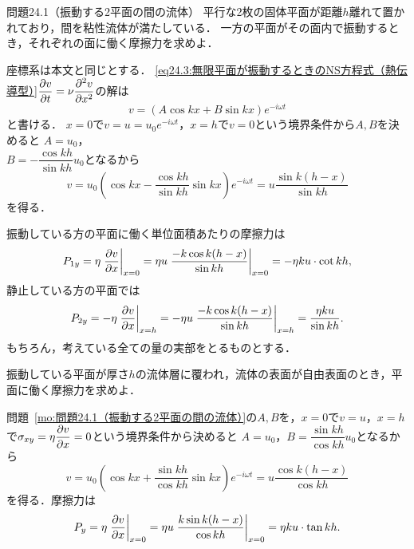 \begin{mondai}{}{問題24.1（振動する2平面の間の流体）}
平行な2枚の固体平面が距離$h$離れて置かれており，間を粘性流体が満たしている．
一方の平面がその面内で振動するとき，それぞれの面に働く摩擦力を求めよ．
\end{mondai}
\begin{kaitou}
座標系は本文と同じとする．
\eqref{eq24.3:無限平面が振動するときのNS方程式（熱伝導型）}$\dpdv{v}{t} = \nu \dpdv[2]{v}{x}$の解は
\[
    v = (A\cos kx + B \sin kx) e^{-i\omega t}
\]
と書ける．
$x=0$で$v=u=u_0 e^{-i\omega t}$，$x=h$で$v=0$という境界条件から$A,B$を決めると
$A=u_0$，\\
$B = - \dfrac{\cos kh}{\sin kh} u_0$となるから
\[
    v = u_0 \left( \cos kx - \frac{\cos kh}{\sin kh} \sin kx \right) e^{-i\omega t}
    = u \frac{\sin k(h-x)}{\sin kh}
\]
を得る．

振動している方の平面に働く単位面積あたりの摩擦力は
\[
    P_{1y} = \eta \eval{\pdv{v}{x}}_{x=0} = \eta u \eval{ \frac{-k \cos k(h-x)}{\sin kh} }_{x=0}
    = -\eta ku \cdot \cot kh,
\]
静止している方の平面では
\[
    P_{2y} = -\eta \eval{\pdv{v}{x}}_{x=h} = -\eta u \eval{ \frac{-k \cos k(h-x)}{\sin kh} }_{x=h}
    = \frac{\eta ku}{\sin kh}.
\]
もちろん，考えている全ての量の実部をとるものとする．



\end{kaitou}





\begin{mondai}{}{}
振動している平面が厚さ$h$の流体層に覆われ，流体の表面が自由表面のとき，平面に働く摩擦力を求めよ．
\end{mondai}
\begin{kaitou}
問題~\ref{mo:問題24.1（振動する2平面の間の流体）}の$A,B$を，$x=0$で$v=u$，$x=h$で$\sigma_{xy}=\eta\dpdv{v}{x}=0$という境界条件から決めると
$A=u_0$，$B = \dfrac{\sin kh}{\cos kh} u_0$となるから
\[
    v = u_0 \left( \cos kx + \frac{\sin kh}{\cos kh} \sin kx \right) e^{-i\omega t}
    = u \frac{\cos k(h-x)}{\cos kh}
\]
を得る．摩擦力は
\[
    P_y = \eta \eval{\pdv{v}{x}}_{x=0} = \eta u \eval{ \frac{k \sin k(h-x)}{\cos kh} }_{x=0}
    = \eta ku \cdot \tan kh.
\]

\end{kaitou}





